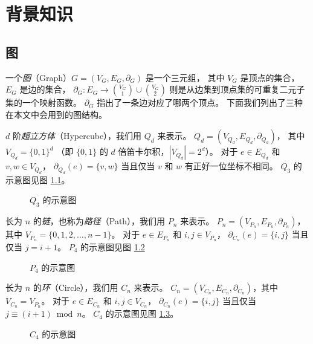 
\chapter{背景知识}
\label{Chapter 2}

\section{图}
\label{Section 2.1}

一个\emph{图}（Graph）$G = (V_G, E_G, \partial_G)$ 是一个三元组，
其中 $V_G$ 是顶点的集合，$E_G$ 是边的集合，
$\partial_G \colon E_G \rightarrow \binom{V_G}{1} \cup \binom{V_G}{2}$
则是从边集到顶点集的可重复二元子集的一个映射函数。
$\partial_G$ 指出了一条边对应了哪两个顶点。
下面我们列出了三种在本文中会用到的图结构。

$d$ 阶\emph{超立方体}（Hypercube），我们用 $Q_d$ 来表示。
$Q_d = (V_{Q_d}, E_{Q_d}, \partial_{Q_d})$，
其中 $V_{Q_d} = \{0, 1\}^d$
（即 $\{0, 1\}$ 的 $d$ 倍笛卡尔积，$|V_{Q_d}| = 2^d$）。
对于 $e \in E_{Q_d}$ 和 $v, w \in V_{Q_d}$，
$\partial_{Q_d}(e) = \{v, w\}$ 当且仅当 $v$ 和 $w$ 有正好一位坐标不相同。
$Q_3$ 的示意图见图 \ref{Figure 2-1}。

\begin{figure}[h!]
	\centering
	
	\caption{$Q_3$ 的示意图}
	\label{Figure 2-1}
\end{figure}

长为 $n$ 的\emph{链}，也称为\emph{路径}（Path），我们用 $P_n$ 来表示。
$P_n = (V_{P_n}, E_{P_n}, \partial_{P_n})$，
其中 $V_{P_n} = \{0, 1, 2, \dots, n - 1\}$。
对于 $e \in E_{P_n}$ 和 $i, j \in V_{P_n}$，
$\partial_{C_n}(e) = \{i, j\}$ 当且仅当 $j = i + 1$。
$P_4$ 的示意图见图 \ref{Figure 2-2}

\begin{figure}[h!]
	\centering
	
	\caption{$P_4$ 的示意图}
	\label{Figure 2-2}
\end{figure}

长为 $n$ 的\emph{环}（Circle），我们用 $C_n$ 来表示。
$C_n = (V_{C_n}, E_{C_n}, \partial_{C_n})$，其中 $V_{C_n} = V_{P_n}$。
对于 $e \in E_{C_n}$ 和 $i, j \in V_{C_n}$，
$\partial_{C_n}(e) = \{i, j\}$ 当且仅当 $j \equiv (i + 1) \bmod n$。
$C_4$ 的示意图见图 \ref{Figure 2-3}。

\begin{figure}[h!]
	\centering
	
	\caption{$C_4$ 的示意图}
	\label{Figure 2-3}
\end{figure}

